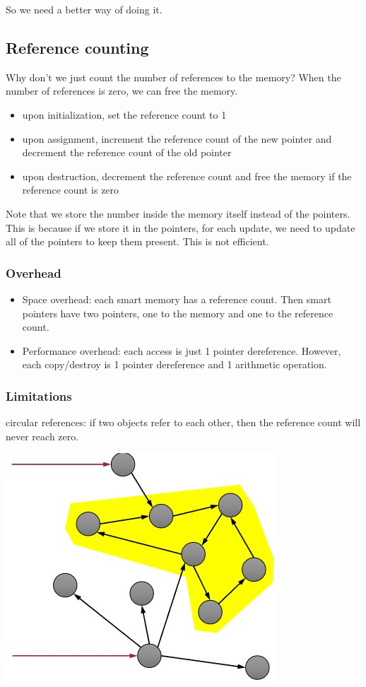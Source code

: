 \documentclass[letterpaper,12pt]{article}
\begin{document}
So we need a better way of doing it.
\subsection{Reference counting}
Why don't we just count the number of references to the memory? When the number
of references is zero, we can free the memory.
\begin{itemize}
    \item upon initialization, set the reference count to 1
    \item upon assignment, increment the reference count of the new pointer and decrement
          the reference count of the old pointer
    \item upon destruction, decrement the reference count and free the memory if the
          reference count is zero
\end{itemize}
Note that we store the number inside the memory itself instead of the pointers. This is because if we store it in the pointers, for each update, we need to update all of the pointers to keep them present. This is not efficient.
\subsubsection{Overhead}
\begin{itemize}
    \item Space overhead: each smart memory has a reference count. Then smart pointers
          have two pointers, one to the memory and one to the reference count.
    \item Performance overhead: each access is just 1 pointer dereference. However, each
          copy/destroy is 1 pointer dereference and 1 arithmetic operation.
\end{itemize}
\subsubsection{Limitations}
circular references: if two objects refer to each other, then the reference
count will never reach zero.

\includegraphics*[scale = 0.6]{./Images/Circular Reference.jpg}
\end{document}
